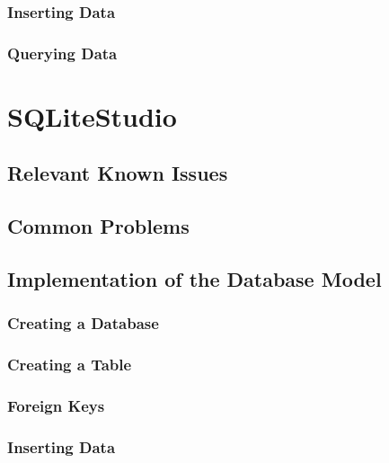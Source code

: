 \documentclass[a4paper,10pt,oneside]{article}
\begin{document}
\subsubsection{Inserting Data}
\label{dbeaverInsertingData}

\subsubsection{Querying Data}
\label{dbeaverQueryingData}


\section{SQLiteStudio}
\label{sqliteStudio}

\subsection{Relevant Known Issues}
\label{sqliteStudioKnownIssues}

\subsection{Common Problems}
\label{sqliteStudioCommonProblems}

\subsection{Implementation of the Database Model}
\label{sqliteStudioImplementation}

\subsubsection{Creating a Database}
\label{sqliteStudioCreatingDatabase}

\subsubsection{Creating a Table}
\label{sqliteStudioCreatingTable}

\subsubsection{Foreign Keys}
\label{sqliteStudioForeignKeys}

\subsubsection{Inserting Data}
\label{sqliteStudioInsertingData}
\end{document}
